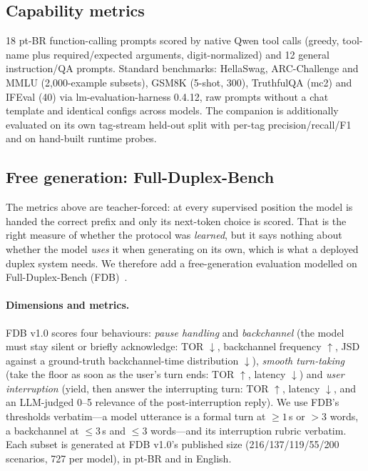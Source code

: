 \documentclass[conference]{IEEEtran}
\begin{document}
\subsection{Capability metrics}
18 pt-BR function-calling prompts scored by native Qwen tool calls (greedy,
tool-name plus required/expected arguments, digit-normalized) and 12 general
instruction/QA prompts. Standard benchmarks: HellaSwag, ARC-Challenge and MMLU
(2{,}000-example subsets), GSM8K (5-shot, 300), TruthfulQA (mc2) and IFEval (40)
via lm-evaluation-harness 0.4.12, raw prompts without a chat template and
identical configs across models. The companion is additionally evaluated on its
own tag-stream held-out split with per-tag precision/recall/F1 and on hand-built
runtime probes.

\subsection{Free generation: Full-Duplex-Bench}
\label{sec:fdb_setup}
The metrics above are teacher-forced: at every supervised position the model is
handed the correct prefix and only its next-token choice is scored. That is the
right measure of whether the protocol was \emph{learned}, but it says nothing
about whether the model \emph{uses} it when generating on its own, which is what a
deployed duplex system needs. We therefore add a free-generation evaluation
modelled on Full-Duplex-Bench (FDB)~\cite{lin2025fdb}.

\paragraph{Dimensions and metrics.} FDB v1.0 scores four behaviours:
\emph{pause handling} and \emph{backchannel} (the model must stay silent or briefly
acknowledge: TOR $\downarrow$, backchannel frequency $\uparrow$, JSD against a
ground-truth backchannel-time distribution $\downarrow$), \emph{smooth
turn-taking} (take the floor as soon as the user's turn ends: TOR $\uparrow$,
latency $\downarrow$) and \emph{user interruption} (yield, then answer the
interrupting turn: TOR $\uparrow$, latency $\downarrow$, and an LLM-judged 0--5
relevance of the post-interruption reply). We use FDB's thresholds verbatim---a
model utterance is a formal turn at ${\ge}1$\,s or ${>}3$ words, a backchannel at
${\le}3$\,s and ${\le}3$ words---and its interruption rubric verbatim. Each subset
is generated at FDB v1.0's published size (216/137/119/55/200 scenarios, 727 per
model), in pt-BR and in English.
\end{document}
